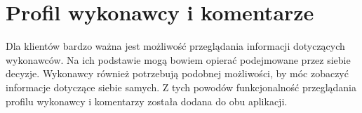 \section{Profil wykonawcy i komentarze}

Dla klientów bardzo ważna jest możliwość przeglądania informacji dotyczących wykonawców. Na ich podstawie mogą bowiem opierać podejmowane przez siebie decyzje. Wykonawcy również potrzebują podobnej możliwości, by móc zobaczyć informacje dotyczące siebie samych. Z tych powodów funkcjonalność przeglądania profilu wykonawcy i komentarzy została dodana do obu aplikacji.

\begin{figure}[ht]
  \captionsetup[subfigure]{justification=centering}
  \centering
  \begin{subfigure}[t]{0.32\textwidth}
    \centering

\end{subfigure}
\end{figure}
